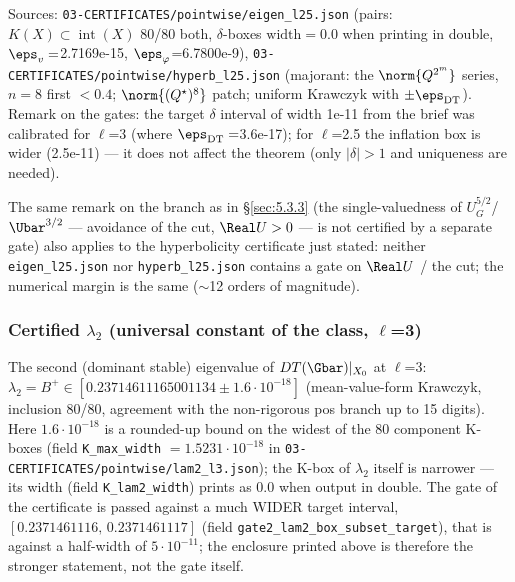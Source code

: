 Sources: \texttt{03-\allowbreak CERTIFICATES/\allowbreak pointwise/\allowbreak eigen\_\allowbreak l25.json} (pairs:
$K(X)\subset \operatorname{int}(X)$ 80/80 both, $\delta$-boxes $\mathrm{width}=0.0$
when printing in double, $\eps_v=$2.7169e-15, $\eps_\varphi$=6.7800e-9),
\texttt{03-\allowbreak CERTIFICATES/\allowbreak pointwise/\allowbreak hyperb\_\allowbreak l25.json} (majorant: the
$\norm{Q^{2^m}}$ series, $n=8$ first $< 0.4$; $\norm{(Q^{\star})^{8}}$ patch;
uniform Krawczyk with $\pm \eps_{\mathrm{DT}}$). Remark on the gates: the
target $\delta$ interval of width 1e-11 from the brief was calibrated for
$\ell$=3 (where $\eps_{\mathrm{DT}}=$3.6e-17); for $\ell$=2.5 the inflation box
is wider (2.5e-11) --- it does not affect the theorem (only $|\delta|>1$ and
uniqueness are needed).

The same remark on the branch as in \S\ref{sec:5.3.3} (the
single-valuedness of $U_G^{5/2}$/$\Ubar^{3/2}$ --- avoidance of the cut,
$\Real U>0$ --- is not certified by a separate gate) also applies to the
hyperbolicity certificate just stated: neither \texttt{eigen\_\allowbreak l25.json} nor \texttt{hyperb\_\allowbreak l25.json} contains a
gate on $\Real U$ / the cut; the numerical margin is the same ($\sim$12 orders of
magnitude).

\subsubsection{Certified $\lambda_2$ (universal constant of the class, $\ell$=3)}
\label{sec:5.3.5}

\begin{proposition}
The second (dominant stable) eigenvalue of $DT(\Gbar)|_{X_{0}}$ at $\ell$=3:
$\lambda_2 = B^{+} \in [0.23714611165001134 \pm 1.6\cdot 10^{-18}]$
(mean-value-form Krawczyk, inclusion 80/80, agreement with the non-rigorous
pos branch up to 15 digits). Here $1.6\cdot 10^{-18}$ is a rounded-up bound on the widest of the 80 component K-boxes (field \texttt{K\_max\_width} $= 1.5231\cdot 10^{-18}$ in \texttt{03-\allowbreak CERTIFICATES/\allowbreak pointwise/\allowbreak lam2\_\allowbreak l3.json}); the K-box of $\lambda_{2}$ itself is narrower --- its width (field \texttt{K\_lam2\_width}) prints as 0.0 when output in double. The gate of the certificate is passed against a much WIDER target interval, $[0.2371461116,\, 0.2371461117]$ (field \texttt{gate2\_\allowbreak lam2\_\allowbreak box\_\allowbreak subset\_\allowbreak target}), that is against a half-width of $5\cdot 10^{-11}$; the enclosure printed above is therefore the stronger statement, not the gate itself.
\end{proposition}

